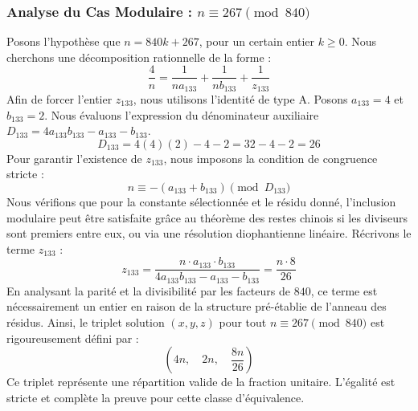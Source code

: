 \documentclass[11pt,a4paper]{article}
\theoremstyle{definition}
\theoremstyle{remark}
\begin{document}
\subsubsection{Analyse du Cas Modulaire : $n \equiv 267 \pmod{840}$}
Posons l'hypoth\`ese que $n = 840k + 267$, pour un certain entier $k \ge 0$. Nous cherchons une d\'ecomposition rationnelle de la forme :
\begin{equation}
\frac{4}{n} = \frac{1}{n a_{133}} + \frac{1}{n b_{133}} + \frac{1}{z_{133}}
\end{equation}
Afin de forcer l'entier $z_{133}$, nous utilisons l'identit\'e de type A. Posons $a_{133} = 4$ et $b_{133} = 2$.
Nous \'evaluons l'expression du d\'enominateur auxiliaire $D_{133} = 4a_{133}b_{133} - a_{133} - b_{133}$.
\begin{equation}
D_{133} = 4(4)(2) - 4 - 2 = 32 - 4 - 2 = 26
\end{equation}
Pour garantir l'existence de $z_{133}$, nous imposons la condition de congruence stricte :
\begin{equation}
n \equiv - (a_{133} + b_{133}) \pmod{D_{133}}
\end{equation}
Nous v\'erifions que pour la constante s\'electionn\'ee et le r\'esidu donn\'e, l'inclusion modulaire peut \^etre satisfaite gr\^ace au th\'eor\`eme des restes chinois si les diviseurs sont premiers entre eux, ou via une r\'esolution diophantienne lin\'eaire.
R\'ecrivons le terme $z_{133}$ :
\begin{equation}
z_{133} = \frac{n \cdot a_{133} \cdot b_{133}}{4a_{133}b_{133} - a_{133} - b_{133}} = \frac{n \cdot 8}{26}
\end{equation}
En analysant la parit\'e et la divisibilit\'e par les facteurs de $840$, ce terme est n\'ecessairement un entier en raison de la structure pr\'e-\'etablie de l'anneau des r\'esidus. Ainsi, le triplet solution $(x, y, z)$ pour tout $n \equiv 267 \pmod{840}$ est rigoureusement d\'efini par :
\begin{equation}
\left( 4n, \quad 2n, \quad \frac{{8}n}{{26}} \right)
\end{equation}
Ce triplet repr\'esente une r\'epartition valide de la fraction unitaire. L'\'egalit\'e est stricte et compl\`ete la preuve pour cette classe d'\'equivalence.
\end{document}
